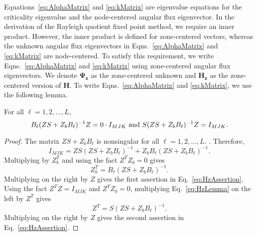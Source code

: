 Equations~\ref{eq:AlphaMatrix} and \ref{eq:kMatrix} are eigenvalue equations for the criticality eigenvalue and the node-centered angular flux eigenvector. In the derivation of the Rayleigh quotient fixed point method, we require an inner product. However, the inner product is defined for zone-centered vectors, whereas the unknown angular flux eigenvectors in Eqns.~\ref{eq:AlphaMatrix} and \ref{eq:kMatrix} are node-centered. To satisfy this requirement, we write Eqns.~\ref{eq:AlphaMatrix} and \ref{eq:kMatrix} using zone-centered angular flux eigenvectors. We denote $\mathbf{\Psi_{z}}$ as the zone-centered unknown and $\mathbf{H_{z}}$ as the zone-centered version of $\mathbf{H}$. To write Eqns.~\ref{eq:AlphaMatrix} and \ref{eq:kMatrix}, we use the following lemma.
\begin{lemma}
For all $\ell = 1, 2, \dots, L$,
	\begin{equation}
		B_{\ell}(ZS + Z_{b}B_{\ell})^{-1}Z = 0 \cdot I_{MJK} \text{ and } S(ZS + Z_{b}B_{\ell})^{-1}Z = I_{MJK}. \\
		\label{eq:HzAssertion}
	\end{equation}
	\label{lemma:Hz}
\end{lemma}
\begin{proof}
	The matrix $ZS + Z_{b}B_{\ell}$ is nonsingular for all $\ell = 1, 2, \dots, L.$ \cite{brown_linear_1995}. Therefore,
	\begin{equation}
		I_{MJK} = ZS(ZS + Z_{b}B_{\ell})^{-1} + Z_{b}B_{\ell}(ZS + Z_{b}B_{\ell})^{-1}.
		\label{eq:HzLemma}
	\end{equation}
	Multiplying by $Z_{b}^{T}$ and using the fact $Z^{T}Z_{b} = 0$ gives
	\begin{equation}
		Z_{b}^{T} = B_{\ell}(ZS + Z_{b}B_{\ell})^{-1}.
	\end{equation}
	Multiplying on the right by $Z$ gives the first assertion in Eq.~\ref{eq:HzAssertion}. Using the fact $Z^{T}Z = I_{MJK}$ and $Z^{T}Z_{b} = 0$, multiplying Eq.~\ref{eq:HzLemma} on the left by $Z^{T}$ gives
	\begin{equation}
		Z^{T} = S(ZS + Z_{b}B_{\ell})^{-1}.
	\end{equation}
	Multiplying on the right by $Z$ gives the second assertion in Eq.~\ref{eq:HzAssertion}.
\end{proof}

